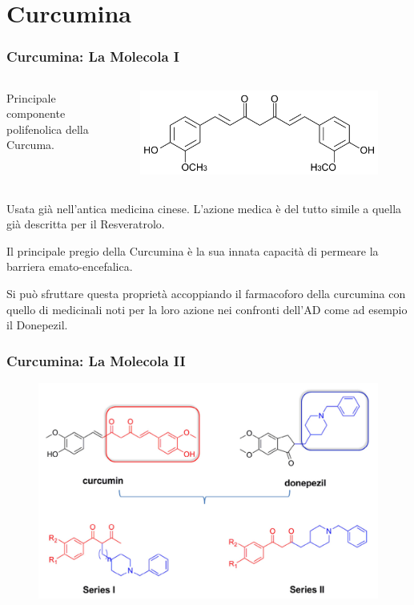 \documentclass[9pt]{beamer}
\begin{document}
\section{Curcumina}

\begin{frame}
	\frametitle{Curcumina: La Molecola I}
	\begin{columns}
		\begin{column}{.4\textwidth}
			Principale componente polifenolica della Curcuma.
		\end{column}
		\begin{column}{.6\textwidth}
			\begin{figure}
				\includegraphics[width=.8\textwidth]{immagini/curcumina.png}
			\end{figure}
		\end{column}
	\end{columns}
	\bigskip
	
	Usata già nell'antica medicina cinese. L'azione medica è del tutto simile a quella già descritta per il Resveratrolo.
	
	Il principale pregio della Curcumina è la sua innata capacità di permeare la barriera emato-encefalica.
	
	Si può sfruttare questa proprietà accoppiando il farmacoforo della curcumina con quello di medicinali noti per la loro azione nei confronti dell'AD come ad esempio il Donepezil.
\end{frame}

\begin{frame}
	\frametitle{Curcumina: La Molecola II}
	\begin{figure}
		\includegraphics[scale=0.9]{immagini/generale_curcdone.png}
	\end{figure}
\end{frame}
\end{document}
